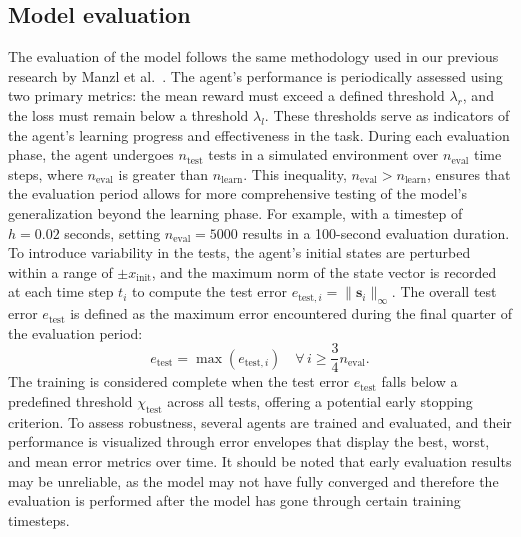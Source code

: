 \subsection{Model evaluation} \label{Model evaluation}
The evaluation of the model follows the same methodology used in our previous research by Manzl et al.~\cite{manzl2023relrl}. The agent's performance is periodically assessed using two primary metrics: the mean reward must exceed a defined threshold \( \lambda_r \), and the loss must remain below a threshold \( \lambda_l \). These thresholds serve as indicators of the agent's learning progress and effectiveness in the task. 
During each evaluation phase, the agent undergoes \( n_{\text{test}} \) tests in a simulated environment over \( n_{\text{eval}} \) time steps, where \( n_{\text{eval}} \) is greater than \( n_{\text{learn}} \). This inequality, \( n_{\text{eval}} > n_{\text{learn}} \), ensures that the evaluation period allows for more comprehensive testing of the model's generalization beyond the learning phase.
For example, with a timestep of \( h = 0.02 \) seconds, setting \( n_{\text{eval}} = 5000 \) results in a 100-second evaluation duration.
To introduce variability in the tests, the agent's initial states are perturbed within a range of \( \pm x_{\text{init}} \), and the maximum norm of the state vector is recorded at each time step \( t_i \) to compute the test error \( e_{\text{test},i} = \|\mathbf{s}_i\|_{\infty} \). The overall test error \( e_{\text{test}} \) is defined as the maximum error encountered during the final quarter of the evaluation period:
\begin{equation}
	e_{\text{test}} = \max(e_{\text{test},i}) \quad \forall \, i \geq \frac{3}{4}n_{\text{eval}}.
\end{equation}
The training is considered complete when the test error \( e_{\text{test}} \) falls below a predefined threshold \( \chi_{\text{test}} \) across all tests, offering a potential early stopping criterion.
To assess robustness, several agents are trained and evaluated, and their performance is visualized through error envelopes that display the best, worst, and mean error metrics over time. It should be noted that early evaluation results may be unreliable, as the model may not have fully converged and therefore the evaluation is performed after the model has gone through certain training timesteps.

